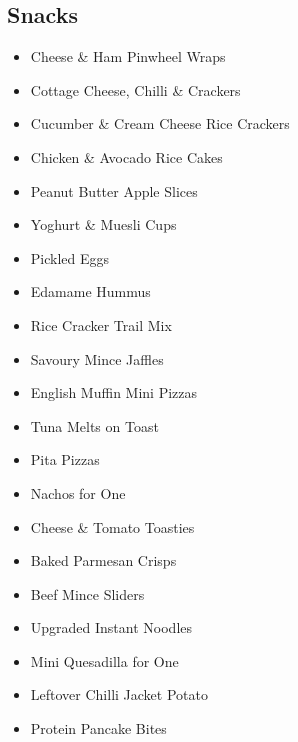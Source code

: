 \subsection*{Snacks}

\begin{itemize}
  \item \todo Cheese \& Ham Pinwheel Wraps 
  \item \todo Cottage Cheese, Chilli \& Crackers
  \item \todo Cucumber \& Cream Cheese Rice Crackers
  \item \todo Chicken \& Avocado Rice Cakes
  \item \todo Peanut Butter Apple Slices
  \item \todo Yoghurt \& Muesli Cups 
  \item \todo Pickled Eggs 
  \item \todo Edamame Hummus
  \item \todo Rice Cracker Trail Mix
\end{itemize}

\begin{itemize}
  \item \todo Savoury Mince Jaffles 
  \item \todo English Muffin Mini Pizzas
  \item \todo Tuna Melts on Toast
  \item \todo Pita Pizzas
  \item \todo Nachos for One
  \item \todo Cheese \& Tomato Toasties
  \item \todo Baked Parmesan Crisps
  \item \todo Beef Mince Sliders
  \item \todo Upgraded Instant Noodles 
  \item \todo Mini Quesadilla for One
  \item \todo Leftover Chilli Jacket Potato
  \item \todo Protein Pancake Bites
\end{itemize}

